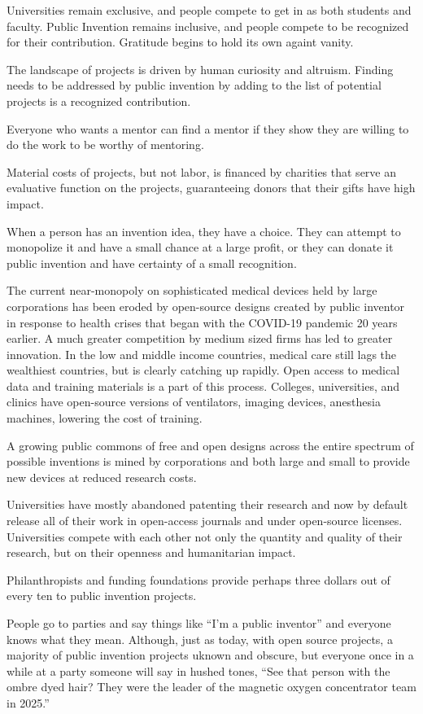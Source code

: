 \documentclass[
	fontsize=10pt, %
	twoside=false, %
	secnumdepth=1, %
]{kaobook}
\begin{document}
Universities remain exclusive, and people compete to get in as
both students and faculty.
Public Invention remains inclusive, and people compete to
be recognized for their contribution. Gratitude begins
to hold its own againt vanity.

The landscape of projects is driven by human curiosity and
altruism. Finding needs to be addressed by public invention
by adding to the list of potential projects is a recognized
contribution.

Everyone who wants a mentor can find a mentor if they
show they are willing
to do the work to be worthy of mentoring.

Material costs of projects, but not labor, is financed by
charities that serve an evaluative function on the projects,
guaranteeing donors that their gifts have high impact.

When a person has an invention idea, they have a choice.
They can attempt to monopolize it and have a small chance at
a large profit, or they can donate it public invention and
have certainty of a small recognition.

The current near-monopoly on sophisticated medical devices held by
large corporations has been eroded by open-source designs
created by public inventor in response to health crises that
began with the COVID-19 pandemic 20 years earlier.
A much greater competition by medium sized firms has led to
greater innovation. In the low and middle income countries,
medical care still lags the wealthiest countries, but is
clearly catching up rapidly.
Open access to medical data and training materials is a
part of this process. Colleges, universities, and clinics
have open-source versions of ventilators, imaging devices,
anesthesia machines, lowering the cost of training.

A growing public commons of free and open designs
across the entire spectrum of possible inventions
is mined by corporations and both large and small to provide
new devices at reduced research costs.

Universities have mostly abandoned patenting their research
and now by default release all of their work in open-access journals
and under open-source licenses. Universities compete with each
other not only the quantity and quality of their research, but
on their openness and humanitarian impact.

Philanthropists and funding foundations provide perhaps three
dollars out of every ten to public invention projects.

People go to parties and say things like ``I'm a public inventor''
and everyone knows what they mean.
Although, just as today, with open source projects, a majority
of public invention projects uknown and obscure, but
everyone once in a while at a party someone will say in hushed tones,
``See that person with the ombre dyed hair? They were the
leader of the magnetic oxygen concentrator team in 2025.''
\end{document}
